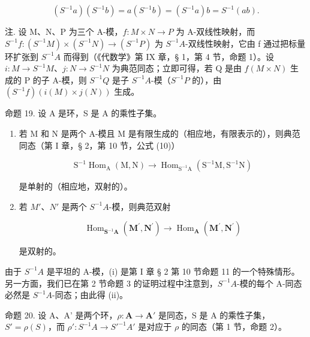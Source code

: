\[
(S ^ {- 1} a) (S ^ {- 1} b) = a (S ^ {- 1} b) = (S ^ {- 1} a) b = S ^ {- 1} (a b).
\]

注. 设 M、N、P 为三个 A-模，\(f: M \times N \to P\) 为 A-双线性映射，而 \(S^{-1}f: (S^{-1}M) \times (S^{-1}N) \to (S^{-1}P)\) 为 \(S^{-1}A\)-双线性映射，它由 f 通过把标量环扩张到 \(S^{-1}A\) 而得到（《代数学》第 IX 章，§ 1，第 4 节，命题 1）。设 \(i: M \to S^{-1}M\)、\(j: N \to S^{-1}N\) 为典范同态；立即可得，若 Q 是由 \(f(M \times N)\) 生成的 P 的子 A-模，则 \(S^{-1}Q\) 是子 \(S^{-1}A\)-模（\(S^{-1}P\) 的），由 \((S^{-1}f)(i(M) \times j(N))\) 生成。

命题 19. 设 A 是环，S 是 A 的乘性子集。

\begin{enumerate}
\def\labelenumi{(\roman{enumi})}
\tightlist
\item
  若 M 和 N 是两个 A-模且 M 是有限生成的（相应地，有限表示的），则典范同态（第 I 章，§ 2，第 10 节，公式 (10)）

\[
\mathrm{S} ^ {- 1} \operatorname{Hom} _ {\mathrm{A}} (\mathrm{M}, \mathrm{N}) \rightarrow \operatorname{Hom} _ {\mathrm{S} ^ {- 1} \mathrm{A}} (\mathrm{S} ^ {- 1} \mathrm{M}, \mathrm{S} ^ {- 1} \mathrm{N})
\]

是单射的（相应地，双射的）。

\item
  若 \(M'\)、\(N'\) 是两个 \(S^{-1}A\)-模，则典范双射

\[
\operatorname{Hom} _ {\mathbf {S} ^ {- 1} \mathbf {A}} (\mathbf {M} ^ {\prime}, \mathbf {N} ^ {\prime}) \rightarrow \operatorname{Hom} _ {\mathbf {A}} (\mathbf {M} ^ {\prime}, \mathbf {N} ^ {\prime})
\]

是双射的。

\end{enumerate}
由于 \(S^{-1}A\) 是平坦的 A-模，(i) 是第 I 章 § 2 第 10 节命题 11 的一个特殊情形。另一方面，我们已在第 2 节命题 3 的证明过程中注意到，\(S^{-1}A\)-模的每个 A-同态必然是 \(S^{-1}A\)-同态；由此得 (ii)。

命题 20. 设 A、A' 是两个环，\(\rho: \mathbf{A} \to \mathbf{A}'\) 是同态，S 是 A 的乘性子集，\(S' = \rho(S)\)，而 \(\rho': S^{-1}A \to S'^{-1}A'\) 是对应于 \(\rho\) 的同态（第 1 节，命题 2）。

